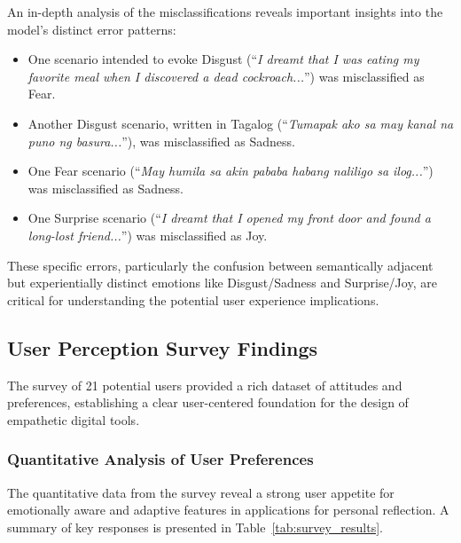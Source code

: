 \documentclass[conference]{IEEEtran}
\begin{document}
	An in-depth analysis of the misclassifications reveals important insights into the model's distinct error patterns:
	\begin{itemize}
		\item One scenario intended to evoke Disgust (``\textit{I dreamt that I was eating my favorite meal when I discovered a dead cockroach...}'') was misclassified as Fear.
		\item Another Disgust scenario, written in Tagalog (``\textit{Tumapak ako sa may kanal na puno ng basura...}''), was misclassified as Sadness.
		\item One Fear scenario (``\textit{May humila sa akin pababa habang naliligo sa ilog...}'') was misclassified as Sadness.
		\item One Surprise scenario (``\textit{I dreamt that I opened my front door and found a long-lost friend...}'') was misclassified as Joy.
	\end{itemize}
	These specific errors, particularly the confusion between semantically adjacent but experientially distinct emotions like Disgust/Sadness and Surprise/Joy, are critical for understanding the potential user experience implications.
	
	\subsection{User Perception Survey Findings}
	The survey of 21 potential users provided a rich dataset of attitudes and preferences, establishing a clear user-centered foundation for the design of empathetic digital tools.
	
	\subsubsection{Quantitative Analysis of User Preferences}
	The quantitative data from the survey reveal a strong user appetite for emotionally aware and adaptive features in applications for personal reflection. A summary of key responses is presented in Table~\ref{tab:survey_results}.
	
\end{document}
